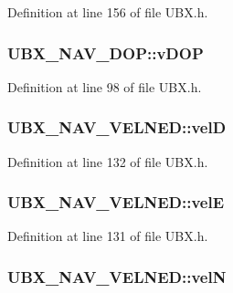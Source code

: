Definition at line 156 of file U\-B\-X.\-h.

\hypertarget{group___g_s_p_module_gafb69d800723e5600027869cb709dd800}{
\subsubsection[{v\-D\-O\-P}]{ U\-B\-X\-\_\-\-N\-A\-V\-\_\-\-D\-O\-P\-::v\-D\-O\-P}}\label{group___g_s_p_module_gafb69d800723e5600027869cb709dd800}


Definition at line 98 of file U\-B\-X.\-h.

\hypertarget{group___g_s_p_module_ga3dcace94a7b7317b432bcdeb69271326}{
\subsubsection[{vel\-D}]{ U\-B\-X\-\_\-\-N\-A\-V\-\_\-\-V\-E\-L\-N\-E\-D\-::vel\-D}}\label{group___g_s_p_module_ga3dcace94a7b7317b432bcdeb69271326}


Definition at line 132 of file U\-B\-X.\-h.

\hypertarget{group___g_s_p_module_ga6a8d3e61f2818644777283c0ea93dec8}{
\subsubsection[{vel\-E}]{ U\-B\-X\-\_\-\-N\-A\-V\-\_\-\-V\-E\-L\-N\-E\-D\-::vel\-E}}\label{group___g_s_p_module_ga6a8d3e61f2818644777283c0ea93dec8}


Definition at line 131 of file U\-B\-X.\-h.

\hypertarget{group___g_s_p_module_gab9c0e5be2137b6287caa0d98942c521d}{
\subsubsection[{vel\-N}]{ U\-B\-X\-\_\-\-N\-A\-V\-\_\-\-V\-E\-L\-N\-E\-D\-::vel\-N}}\label{group___g_s_p_module_gab9c0e5be2137b6287caa0d98942c521d}


